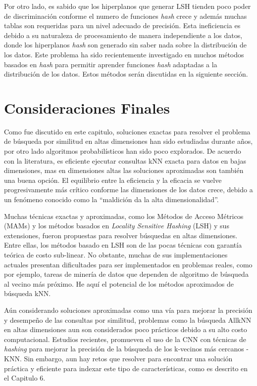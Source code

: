 Por otro lado, es  sabido que los hiperplanos que generar LSH tienden  poco  poder de discriminación conforme el numero de funciones \textit{hash} crece y además muchas tablas son requeridas para un nivel adecuado de precisión. Esta ineficiencia es debido a su naturaleza de procesamiento de manera independiente a los datos, donde los hiperplanos \textit{hash} son generado sin saber nada sobre la distribución de los datos.  Este problema  ha sido recientemente investigado en muchos métodos basados en \textit{hash} para permitir aprender funciones \textit{hash} adaptadas a la distribución de los datos. Estos métodos serán  discutidas en la siguiente sección. 

 
 
 
\section{Consideraciones Finales}

Como fue discutido en este capitulo,  soluciones exactas para  resolver el problema de búsqueda por similitud en altas dimensiones han sido estudiadas durante años, por otro lado algoritmos probabilísticos han sido poco explorados. De acuerdo con la literatura, es eficiente ejecutar consultas kNN exacta para datos en bajas dimensiones, mas en dimensiones altas las soluciones aproximadas son también una buena opción. El equilibrio entre la eficiencia y la eficacia se vuelve progresivamente más crítico conforme las dimensiones de los datos crece, debido a un fenómeno conocido como   la ``maldición  da la alta dimensionalidad''.

Muchas técnicas exactas y aproximadas, como los Métodos de Acceso Métricos (MAMs) y los métodos basados en \textit{Locality Sensitive Hashing} (LSH) y sus extensiones, fueron propuestas para resolver búsquedas en altas dimensiones.  Entre ellas, los métodos basado en LSH son de las pocas técnicas con garantía teórica de costo sub-linear. No obstante, muchas de sus implementaciones actuales presentan dificultades para ser implementados en problemas reales, como por ejemplo, tareas de minería de datos que dependen de algoritmo de búsqueda al vecino más próximo. He aquí el potencial de los métodos aproximados de búsqueda kNN.

Aún considerando soluciones aproximadas como una vía para mejorar la precisión y desempeño  de las consultas por similitud, problemas como la búsqueda AllkNN en altas dimensiones aun son considerados poco prácticos debido a su alto costo computacional. Estudios recientes, promueven el uso de la \acf{CNN} con técnicas de  \textit{hashing} para mejorar la precisión de la búsqueda de los k-vecinos más cercanos - KNN.  Sin embargo, aun hay retos que resolver para encontrar una solución práctica y eficiente para indexar este tipo de características, como es descrito en el Capitulo 6. 

  
